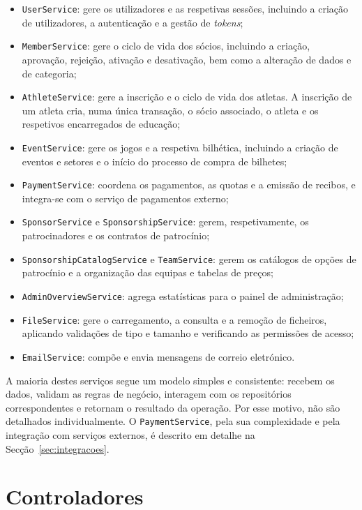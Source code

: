 \begin{itemize}
    \item \texttt{UserService}: gere os utilizadores e as respetivas sessões, 
    incluindo a criação de utilizadores, a autenticação e a gestão de 
    \textit{tokens};
    \item \texttt{MemberService}: gere o ciclo de vida dos sócios, incluindo a 
    criação, aprovação, rejeição, ativação e desativação, bem como a alteração 
    de dados e de categoria;
    \item \texttt{AthleteService}: gere a inscrição e o ciclo de vida dos 
    atletas. A inscrição de um atleta cria, numa única transação, o sócio 
    associado, o atleta e os respetivos encarregados de educação;
    \item \texttt{EventService}: gere os jogos e a respetiva bilhética, 
    incluindo a criação de eventos e setores e o início do processo de compra 
    de bilhetes;
    \item \texttt{PaymentService}: coordena os pagamentos, as quotas e a 
    emissão de recibos, e integra-se com o serviço de pagamentos externo;
    \item \texttt{SponsorService} e \texttt{SponsorshipService}: gerem, 
    respetivamente, os patrocinadores e os contratos de patrocínio;
    \item \texttt{SponsorshipCatalogService} e \texttt{TeamService}: gerem os 
    catálogos de opções de patrocínio e a organização das equipas e tabelas de 
    preços;
    \item \texttt{AdminOverviewService}: agrega estatísticas para o painel de 
    administração;
    \item \texttt{FileService}: gere o carregamento, a consulta e a remoção de 
    ficheiros, aplicando validações de tipo e tamanho e verificando as 
    permissões de acesso;
    \item \texttt{EmailService}: compõe e envia mensagens de correio 
    eletrónico.
\end{itemize}

A maioria destes serviços segue um modelo simples e consistente: recebem os 
dados, validam as regras de negócio, interagem com os repositórios 
correspondentes e retornam o resultado da operação. Por esse motivo, não são 
detalhados individualmente. O \texttt{PaymentService}, pela sua complexidade e 
pela integração com serviços externos, é descrito em detalhe na 
Secção~\ref{sec:integracoes}.

\section{Controladores}

